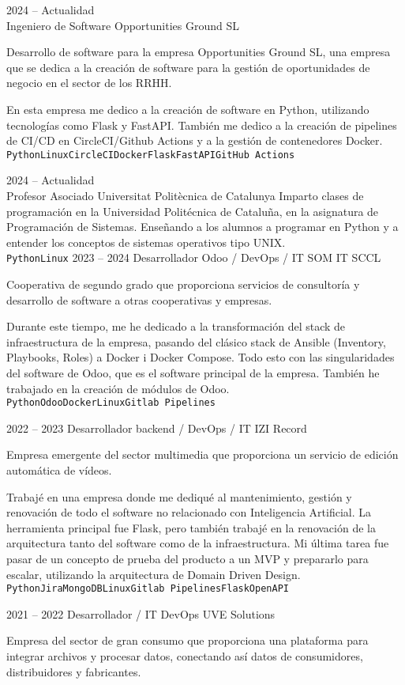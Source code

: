 \documentclass[9pt]{developercv} %
\begin{document}
\begin{entrylist}
	\entry
	{2024 -- Actualidad\\}
	{Ingeniero de Software}
	{Opportunities Ground SL}
	{
		Desarrollo de software para la empresa Opportunities Ground SL, una empresa que se dedica a la creación de software para la gestión de oportunidades de negocio en el sector de los RRHH.

		En esta empresa me dedico a la creación de software en Python, utilizando tecnologías como Flask y FastAPI. También me dedico a la creación de pipelines de CI/CD en CircleCI/Github Actions y a la gestión de contenedores Docker.
		\\ \texttt{Python}\slashsep\texttt{Linux}\slashsep\texttt{CircleCI}\slashsep\texttt{Docker}\slashsep\texttt{Flask}\slashsep\texttt{FastAPI}\slashsep\texttt{GitHub Actions}
	}
	\entry
	{2024 -- Actualidad\\}
	{Profesor Asociado}
	{Universitat Politècnica de Catalunya}
	{
		Imparto clases de programación en la Universidad Politécnica de Cataluña, en la asignatura de Programación de Sistemas. Enseñando a los alumnos a programar en Python y a entender los conceptos de sistemas operativos tipo UNIX.
		\\ \texttt{Python}\slashsep\texttt{Linux}
	}
	\entry
	{2023 -- 2024}
	{Desarrollador Odoo / DevOps / IT}
	{SOM IT SCCL}
	{Cooperativa de segundo grado que proporciona servicios de consultoría y desarrollo de software a otras cooperativas y empresas.

		Durante este tiempo, me he dedicado a la transformación del stack de infraestructura de la empresa, pasando del clásico stack de Ansible (Inventory, Playbooks, Roles) a Docker i Docker Compose. Todo esto con las singularidades del software de Odoo, que es el software principal de la empresa. También he trabajado en la creación de módulos de Odoo.
		\\ \texttt{Python}\slashsep\texttt{Odoo}\slashsep\texttt{Docker}\slashsep\texttt{Linux}\slashsep\texttt{Gitlab Pipelines}
	}
	\entry
	{2022 -- 2023}
	{Desarrollador backend / DevOps / IT}
	{IZI Record}
	{Empresa emergente del sector multimedia que proporciona un servicio de edición automática de vídeos.

		Trabajé en una empresa donde me dediqué al mantenimiento, gestión y renovación de todo el software no relacionado con Inteligencia Artificial. La herramienta principal fue Flask, pero también trabajé en la renovación de la arquitectura tanto del software como de la infraestructura. Mi última tarea fue pasar de un concepto de prueba del producto a un MVP y prepararlo para escalar, utilizando la arquitectura de Domain Driven Design.
		\\ \texttt{Python}\slashsep\texttt{Jira}\slashsep\texttt{MongoDB}\slashsep\texttt{Linux}\slashsep\texttt{Gitlab Pipelines}\slashsep\texttt{Flask}\slashsep\texttt{OpenAPI}}
	\entry
	{2021 -- 2022}
	{Desarrollador / IT DevOps}
	{UVE Solutions}
	{Empresa del sector de gran consumo que proporciona una plataforma para integrar archivos y procesar datos, conectando así datos de consumidores, distribuidores y fabricantes.

}
\end{entrylist}
\end{document}
